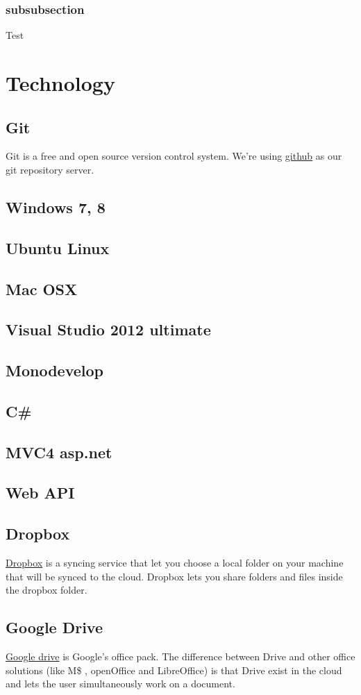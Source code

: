 \documentclass[12pt, a4paper]{article}
\begin{document}
\subsubsection{subsubsection}
Test
 
 
\section{Technology}
\subsection{Git}
Git is a free and open source version control system. We're using \href{http://www.github.com}{github} as our git repository server.
\subsection{Windows 7, 8}
\subsection{Ubuntu Linux}
\subsection{Mac OSX}
\subsection{Visual Studio 2012 ultimate}
\subsection{Monodevelop}
\subsection{C\#}
\subsection{MVC4 asp.net}
\subsection{Web API}
\subsection{Dropbox}
\href{http://www.dropbox.com}{Dropbox} is a syncing service that let you choose a local folder on your machine that will be synced to the cloud. Dropbox lets you share folders and files inside the dropbox folder.
\subsection{Google Drive}
\href{https://drive.google.com/}{Google drive} is Google's office pack. The difference between Drive and other office solutions (like M\$ , openOffice and LibreOffice) is that Drive exist in the cloud and lets the user simultaneously work on a document.
\end{document}
